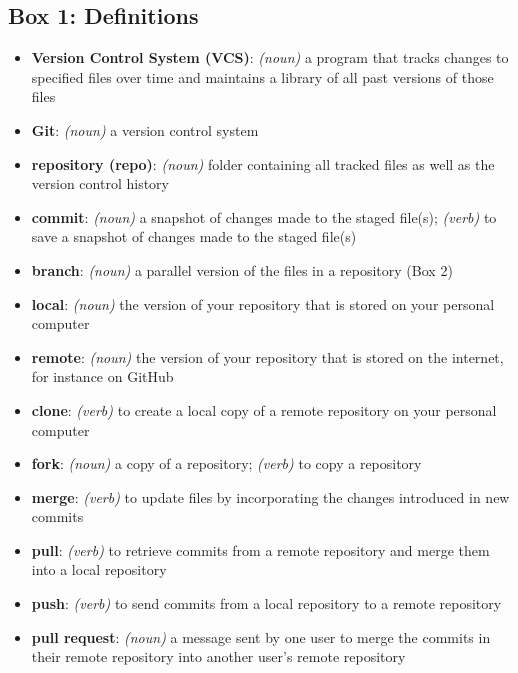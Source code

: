 \subsection{Box 1: Definitions}

\begin{itemize}
\item \textbf{Version Control System (VCS)}: \textit{(noun)} a program that tracks changes to specified files over time and maintains a library of all past versions of those files 
\item \textbf{Git}: \textit{(noun)} a version control system
\item \textbf{repository (repo)}: \textit{(noun)} folder containing all tracked files as well as the version control history
\item \textbf{commit}: \textit{(noun)} a snapshot of changes made to the staged file(s); \textit{(verb)} to save a snapshot of changes made to the staged file(s) 
\item \textbf{branch}: \textit{(noun)} a parallel version of the files in a repository (Box 2)
\item \textbf{local}: \textit{(noun)} the version of your repository that is stored on your personal computer
\item \textbf{remote}: \textit{(noun)} the version of your repository that is stored on the internet, for instance on GitHub
\item \textbf{clone}: \textit{(verb)} to create a local copy of a remote repository on your personal computer
\item \textbf{fork}: \textit{(noun)} a copy of a repository; \textit{(verb)} to copy a repository
\item \textbf{merge}: \textit{(verb)} to update files by incorporating the changes introduced in new commits
\item \textbf{pull}: \textit{(verb)} to retrieve commits from a remote repository and merge them into a local repository
\item \textbf{push}: \textit{(verb)} to send commits from a local repository to a remote repository
\item \textbf{pull request}: \textit{(noun)} a message sent by one user to merge the commits in their remote repository into another user's remote repository
\end{itemize}